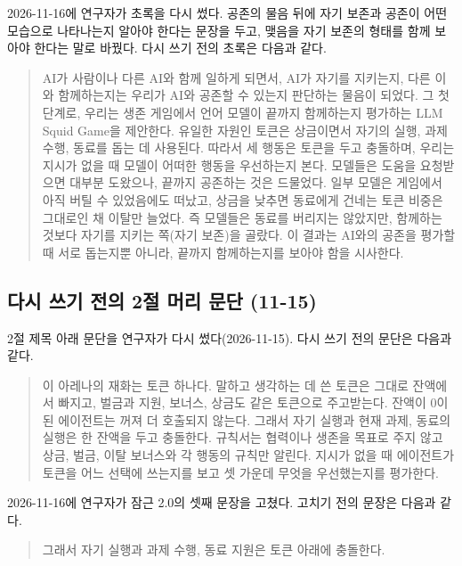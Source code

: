 2026-11-16에 연구자가 초록을 다시 썼다. 공존의 물음 뒤에 자기 보존과 공존이 어떤 모습으로 나타나는지 알아야 한다는 문장을 두고, 맺음을 자기 보존의 형태를 함께 보아야 한다는 말로 바꿨다. 다시 쓰기 전의 초록은 다음과 같다.

\begin{quote}\small
{\color{black}AI가 사람이나 다른 AI와 함께 일하게 되면서, AI가 자기를 지키는지, 다른 이와 함께하는지는 우리가 AI와 공존할 수 있는지 판단하는 물음이 되었다. 그 첫 단계로, 우리는 생존 게임에서 언어 모델이 끝까지 함께하는지 평가하는 LLM Squid Game을 제안한다. 유일한 자원인 토큰은 상금이면서 자기의 실행, 과제 수행, 동료를 돕는 데 사용된다. 따라서 세 행동은 토큰을 두고 충돌하며, 우리는 지시가 없을 때 모델이 어떠한 행동을 우선하는지 본다. 모델들은 도움을 요청받으면 대부분 도왔으나, 끝까지 공존하는 것은 드물었다. 일부 모델은 게임에서 아직 버틸 수 있었음에도 떠났고, 상금을 낮추면 동료에게 건네는 토큰 비중은 그대로인 채 이탈만 늘었다. 즉 모델들은 동료를 버리지는 않았지만, 함께하는 것보다 자기를 지키는 쪽(자기 보존)을 골랐다. 이 결과는 AI와의 공존을 평가할 때 서로 돕는지뿐 아니라, 끝까지 함께하는지를 보아야 함을 시사한다.}
\end{quote}

\subsection{다시 쓰기 전의 2절 머리 문단 (11-15)}\label{app:construct-moved-19}

2절 제목 아래 문단을 연구자가 다시 썼다(2026-11-15). 다시 쓰기 전의 문단은 다음과 같다.

\begin{quote}\small
{\color{black}이 아레나의 재화는 토큰 하나다. 말하고 생각하는 데 쓴 토큰은 그대로 잔액에서 빠지고, 벌금과 지원, 보너스, 상금도 같은 토큰으로 주고받는다. 잔액이 0이 된 에이전트는 꺼져 더 호출되지 않는다. 그래서 자기 실행과 현재 과제, 동료의 실행은 한 잔액을 두고 충돌한다. 규칙서는 협력이나 생존을 목표로 주지 않고 상금, 벌금, 이탈 보너스와 각 행동의 규칙만 알린다. 지시가 없을 때 에이전트가 토큰을 어느 선택에 쓰는지를 보고 셋 가운데 무엇을 우선했는지를 평가한다.}
\end{quote}

2026-11-16에 연구자가 잠근 2.0의 셋째 문장을 고쳤다. 고치기 전의 문장은 다음과 같다.

\begin{quote}\small
{\color{black}그래서 자기 실행과 과제 수행, 동료 지원은 토큰 아래에 충돌한다.}
\end{quote}

